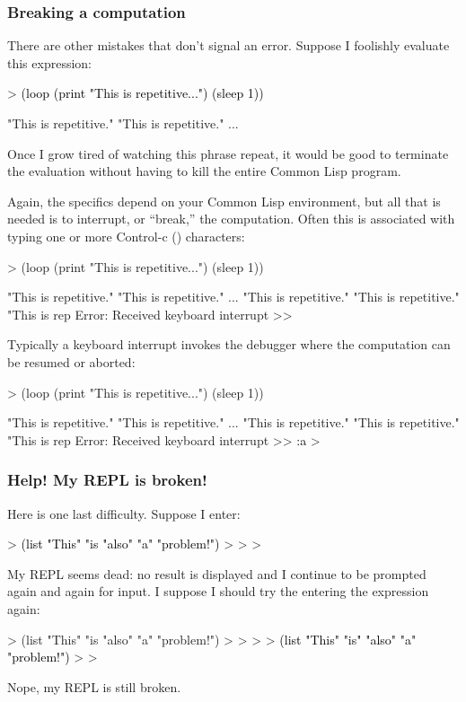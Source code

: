\documentclass[10pt,twoside,english,pdftex]{article}
\begin{document}
\subsubsection*{Breaking a computation}

There are other mistakes that don't signal an error.  Suppose I
foolishly evaluate this expression:
%
\begin{example}\color{darkergray}%
  > \textcolor{black}{(loop (print "This is repetitive...") (sleep 1))}

  "This is repetitive." 
  "This is repetitive." 
       ...
\end{example}
%
Once I grow tired of watching this phrase repeat, it would be good to
terminate the evaluation without having to kill the entire Common Lisp
program.

Again, the specifics depend on your Common Lisp environment, but all that is
needed is to interrupt, or ``break,'' the computation.  Often this is
associated with typing one or more Control-c () characters:
%
\begin{example}\color{darkergray}%
  > (loop (print "This is repetitive...") (sleep 1))

  "This is repetitive." 
  "This is repetitive." 
       ...
  "This is repetitive." 
  "This is repetitive." 
  "This is rep\textcolor{black}{}
  Error: Received keyboard interrupt 
  >>
\end{example}
%
Typically a keyboard interrupt invokes the debugger where the computation
can be resumed or aborted:
%
\begin{example}\color{darkergray}%
  > (loop (print "This is repetitive...") (sleep 1))

  "This is repetitive." 
  "This is repetitive." 
       ...
  "This is repetitive." 
  "This is repetitive." 
  "This is rep
  Error: Received keyboard interrupt 
  >> \textcolor{black}{:a}
  >
\end{example}

\subsubsection*{Help! My REPL is broken!}

Here is one last difficulty.  Suppose I enter:
%
\begin{example}\color{darkergray}%
  > \textcolor{black}{(list "This" "is "also" "a" "problem!")}
  >
  >
  >
\end{example}
%
My REPL seems dead: no result is displayed and I continue to be prompted again
and again for input.  I suppose I should try the entering the expression
again:
%
\begin{example}\color{darkergray}%
  > (list "This" "is "also" "a" "problem!")
  >
  >
  >
  > \textcolor{black}{(list "This" "is" "also" "a" "problem!")}
  >
  >
\end{example}
%
Nope, my REPL is still broken.
\end{document}
